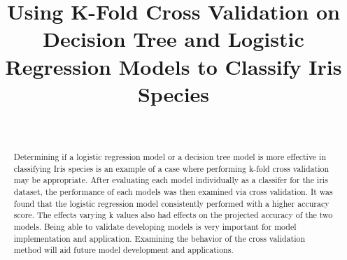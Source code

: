 \documentclass[journal]{IEEEtran}
\begin{document}
\setlength{\emergencystretch}{12pt}
\setlength{\parindent}{10pt}



\lstset{style=mystyle}

\title{Using K-Fold Cross Validation on Decision Tree and Logistic Regression Models to Classify Iris Species}

\author{
\\
}

\maketitle

\begin{abstract}
\label{log:abstract}
Determining if a logistic regression model or a decision tree model is more effective in classifying Iris species is an example of a case where performing k-fold cross validation may be appropriate. After evaluating each model individually as a classifer for the iris dataset, the performance of each models was then examined via cross validation. It was found that the logistic regression model consistently performed with a higher accuracy score. The effects varying k values also had effects on the projected accuracy of the two models. Being able to validate developing models is very important for model implementation and application. Examining the behavior of the cross validation method will aid future model development and applications. 
\end{abstract}
\end{document}
